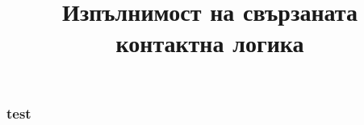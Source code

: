 \documentclass[11pt]{beamer}
\date[\today]{}
\title{Изпълнимост на свързаната контактна логика}
\author[А. Дудов]{

}
\begin{document}
\begin{frame}
\titlepage
\end{frame}


\begin{frame}

\frametitle{test}

\end{frame}
\end{document}
